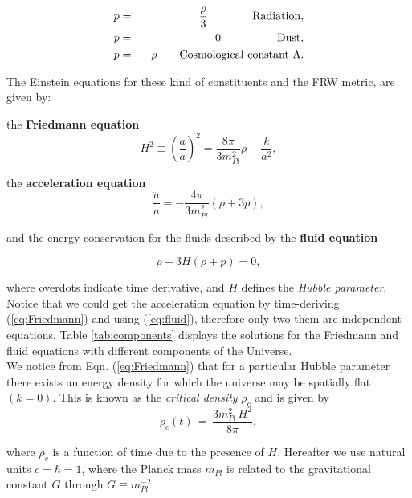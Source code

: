 \documentclass{rmaa}
\def\beq{\begin{equation}}
\def\eeq{\end{equation}}
\begin{document}
\begin{eqnarray}
p&=& \frac{\rho}{3} \qquad \qquad {\rm Radiation}, \nonumber \\
p&=&0 \qquad \qquad \quad {\rm Dust}, \\
p&=&-\rho  \qquad {\rm Cosmological~ constant}~ \Lambda. \nonumber
\end{eqnarray}

\noindent
The Einstein equations for these kind of constituents and the FRW metric, are given by:

\noindent
the {\bf Friedmann equation}
\beq\label{eq:Friedmann}
H^2  \equiv  \left(\frac{\dot a}{a} \right)^2 = \frac{8\pi}{3 m^2_{Pl}} \rho  - \frac{k}{a^2}, 
\eeq

\noindent
the {\bf acceleration equation}
\beq \label{eq:Acce}
\frac{\ddot{a}}{a}  =   - \frac{4\pi }{3 m^2_{Pl}} (\rho +3p),
\eeq

\noindent
and the energy conservation for the fluids described by the {\bf fluid equation}

\begin{equation} \label{eq:fluid}
\dot \rho + 3H(\rho + p)=0,
\end{equation}

\noindent
where overdots indicate time derivative, and $H$ defines the \textit{Hubble parameter}. 
Notice that we could get the acceleration equation by time-deriving (\ref{eq:Friedmann}) 
and using (\ref{eq:fluid}), therefore only two them are independent equations.  
Table \ref{tab:components} displays the solutions for the Friedmann and fluid equations with 
different components of the Universe.
 \\

We notice from Eqn. (\ref{eq:Friedmann}) that for a particular 
Hubble parameter there exists an energy density for which the universe may be spatially flat 
$(k=0)$. This is known as the {\it critical density} $\rho_c$ and is given by
%
\beq
\rho_c(t)\, =\, \frac{3 m^2_{Pl} \,H^2}{8\pi},
\eeq

\noindent
where $\rho_c$ is a function of time due to the presence of $H$. 
Hereafter we use natural units $c=\hbar=1$, where the Planck mass $m_{Pl}$ is related 
to the gravitational constant $G$ through $G\equiv m^{-2}_{Pl}$.
\end{document}
